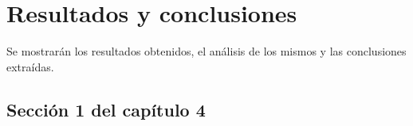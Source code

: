 
\chapter{Resultados y conclusiones} %
\label{Chapter4} %

Se mostrarán los resultados obtenidos, el análisis de los mismos y las conclusiones extraídas.

\section{Sección 1 del capítulo 4}